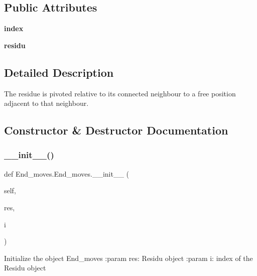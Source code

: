 \subsection*{Public Attributes}
\begin{DoxyCompactItemize}
\item 
\mbox{\label{classEnd__moves_1_1End__moves_a1b7617746594f19259fa997839b674b4}} 
{\bfseries index}
\item 
\mbox{\label{classEnd__moves_1_1End__moves_aa62e058761c54511a7f379ae0c4c8608}} 
{\bfseries residu}
\end{DoxyCompactItemize}


\subsection{Detailed Description}
\begin{DoxyVerb}The residue is pivoted relative to its connected
    neighbour to a free position adjacent to that neighbour.
\end{DoxyVerb}
 

\subsection{Constructor \& Destructor Documentation}
\mbox{\label{classEnd__moves_1_1End__moves_ae5788aa8e49a0569fc9c88cb3a74e722}} 
\subsubsection{\texorpdfstring{\+\_\+\+\_\+init\+\_\+\+\_\+()}{\_\_init\_\_()}}
{\footnotesize\ttfamily def End\+\_\+moves.\+End\+\_\+moves.\+\_\+\+\_\+init\+\_\+\+\_\+ (\begin{DoxyParamCaption}\item[{}]{self,  }\item[{}]{res,  }\item[{}]{i }\end{DoxyParamCaption})}

\begin{DoxyVerb}Initialize the object End_moves
    :param res: Residu object
    :param   i: index of the Residu object
\end{DoxyVerb}
 

